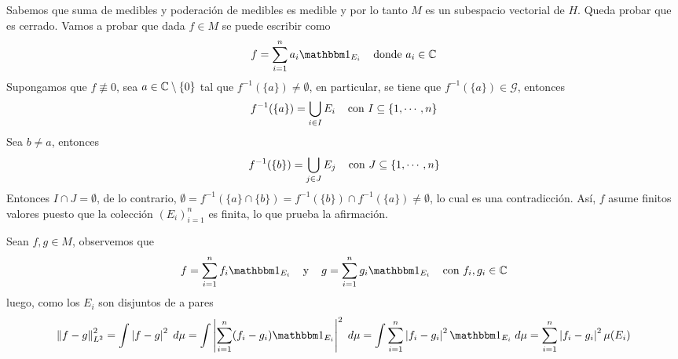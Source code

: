 \documentclass{article}
\begin{document}
\begin{enumerate}
    Sabemos que suma de medibles y poderación de medibles es medible y por lo tanto $M$ es un
    subespacio vectorial de $H$. Queda probar que es cerrado. Vamos a probar que dada $f\in M$ se 
    puede escribir como
    \begin{equation*}
        f=\sum_{i=1}^{n}a_{i}\I_{E_{i}}\hspace{4mm}\text{donde }a_{i}\in\C
    \end{equation*}
    Supongamos que $f\not\equiv0$, sea $a\in\mathbb{C}\setminus\{0\}$ tal que $f^{-1}(\{a\})
    \neq\emptyset$, en particular, se tiene que $f^{-1}(\{a\})\in\mathcal{G}$, entonces
    \begin{equation*}
        f^{-1}(\{a\})=\bigcup_{i\in I}E_{i}\hspace{4mm}\text{con }I\subseteq\{1,\cdots,n\}
    \end{equation*}
    Sea $b\neq a$, entonces
    \begin{equation*}
        f^{-1}(\{b\})=\bigcup_{j\in J}E_{j}\hspace{4mm}\text{con }J\subseteq\{1,\cdots,n\}
    \end{equation*}
    Entonces $I\cap J=\emptyset$, de lo contrario, $\emptyset=f^{-1}(\{a\}\cap\{b\})
    =f^{-1}(\{b\})\cap f^{-1}(\{a\})\neq\emptyset$, lo cual es una contradicción. Así, $f$ asume
    finitos valores puesto que la colección $(E_{i})_{i=1}^{n}$ es finita, lo que prueba la 
    afirmación.

    Sean $f,g\in M$, observemos que
    \begin{equation*}
        f=\sum_{i=1}^{n}f_{i}\I_{E_{i}}\hspace{4mm}\text{y}\hspace{4mm}
        g=\sum_{i=1}^{n}g_{i}\I_{E_{i}}
        \hspace{4mm}\text{con }f_{i},g_{i}\in\C
    \end{equation*}
    luego, como los $E_{i}$ son disjuntos de a pares
    \begin{equation*}
        \norm{f-g}_{L^{2}}^{2}=\int \abs{f-g}^{2}\hspace{1mm}d\mu
        =\int\abs{\sum_{i=1}^{n}(f_{i}-g_{i})\I_{E_{i}}}^{2}\hspace{1mm}d\mu
        =\int\sum_{i=1}^{n}\abs{f_{i}-g_{i}}^{2}\I_{E_{i}}\hspace{1mm}d\mu
        =\sum_{i=1}^{n}\abs{f_{i}-g_{i}}^{2}\mu(E_{i})
    \end{equation*}


\end{enumerate}
\end{document}
